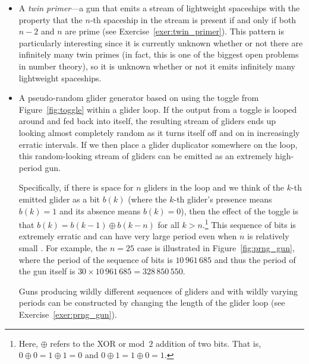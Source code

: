 \begin{itemize}
	\item A \emph{twin primer}---a gun that emits a stream of lightweight spaceships with the property that the $n$-th spaceship in the stream is present if and only if both $n-2$ and $n$ are prime (see Exercise~\ref{exer:twin_primer}). This pattern is particularly interesting since it is currently unknown whether or not there are infinitely many twin primes (in fact, this is one of the biggest open problems in number theory), so it is unknown whether or not it emits infinitely many lightweight spaceships.\smallskip
	
	\item A pseudo-random glider generator based on using the toggle from Figure~\ref{fig:toggle} within a glider loop. If the output from a toggle is looped around and fed back into itself, the resulting stream of gliders ends up looking almost completely random as it turns itself off and on in increasingly erratic intervals. If we then place a glider duplicator somewhere on the loop, this random-looking stream of gliders can be emitted as an extremely high-period gun.
	
	Specifically, if there is space for $n$ gliders in the loop and we think of the $k$-th emitted glider as a bit $b(k)$ (where the $k$-th glider's presence means $b(k) = 1$ and its absence means $b(k) = 0$), then the effect of the toggle is that $b(k) = b(k-1) \oplus b(k-n)$ for all $k > n$.\footnote{Here, $\oplus$ refers to the XOR or mod~$2$ addition of two bits. That is, $0 \oplus 0 = 1 \oplus 1 = 0$ and $0 \oplus 1 = 1 \oplus 0 = 1$.} This sequence of bits is extremely erratic and can have very large period even when $n$ is relatively small \cite{A046932}. For example, the $n = 25$ case is illustrated in Figure~\ref{fig:prng_gun}, where the period of the sequence of bits is $10\,961\,685$ and thus the period of the gun itself is $30 \times 10\,961\,685 = 328\,850\,550$.
	
	Guns producing wildly different sequences of gliders and with wildly varying periods can be constructed by changing the length of the glider loop (see Exercise~\ref{exer:prng_gun}).\bigskip
	

\end{itemize}
